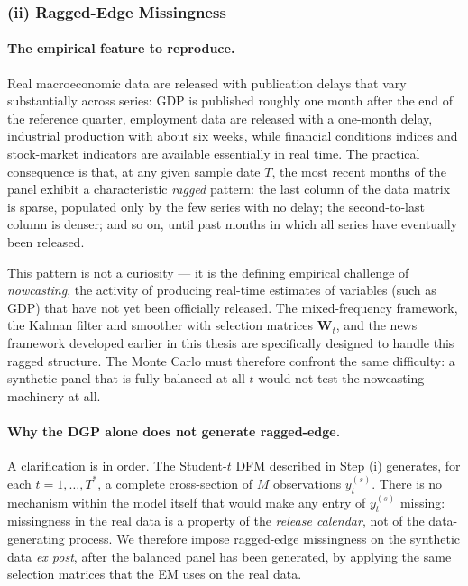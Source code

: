 \documentclass[11pt, a4paper, oneside]{article}
\begin{document}
\subsubsection*{(ii) Ragged-Edge Missingness}
\label{subsubsec:sim-ragged-edge}

\paragraph{The empirical feature to reproduce.}
Real macroeconomic data are released with publication delays that
vary substantially across series: GDP is published roughly one
month after the end of the reference quarter, employment data are
released with a one-month delay, industrial production with about
six weeks, while financial conditions indices and stock-market
indicators are available essentially in real time. The practical
consequence is that, at any given sample date $T$, the most recent
months of the panel exhibit a characteristic \emph{ragged} pattern:
the last column of the data matrix is sparse, populated only by
the few series with no delay; the second-to-last column is
denser; and so on, until past months in which all series have
eventually been released.

This pattern is not a curiosity — it is the defining empirical
challenge of \emph{nowcasting}, the activity of producing
real-time estimates of variables (such as GDP) that have not yet
been officially released. The mixed-frequency framework, the
Kalman filter and smoother with selection matrices $\mathbf{W}_t$,
and the news framework developed earlier in this thesis are
specifically designed to handle this ragged structure. The Monte
Carlo must therefore confront the same difficulty: a synthetic
panel that is fully balanced at all $t$ would not test the
nowcasting machinery at all.

\paragraph{Why the DGP alone does not generate ragged-edge.}
A clarification is in order. The Student-$t$ DFM described in
Step (i) generates, for each $t = 1, \ldots, T^*$, a complete
cross-section of $M$ observations $y_t^{(s)}$. There is no
mechanism within the model itself that would make any entry of
$y_t^{(s)}$ missing: missingness in the real data is a property of
the \emph{release calendar}, not of the data-generating process.
We therefore impose ragged-edge missingness on the synthetic data
\emph{ex post}, after the balanced panel has been generated, by
applying the same selection matrices that the EM uses on the real
data.
\end{document}
